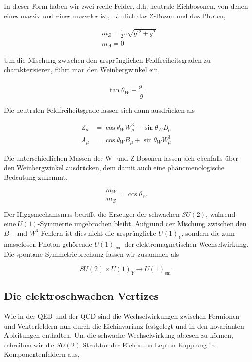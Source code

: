 \documentclass[10pt, letterpaper]{article}
\begin{document}
In dieser Form haben wir zwei reelle Felder, d.h. neutrale Eichbosonen, von denen eines massiv und eines masselos ist, nämlich das Z-Boson und das Photon,

$$
\begin{aligned}
& m_{Z}=\frac{1}{2} v \sqrt{g^{\prime 2}+g^{2}} \\
& m_{A}=0
\end{aligned}
$$

Um die Mischung zwischen den ursprünglichen Feldfreiheitsgraden zu charakterisieren, führt man den Weinbergwinkel ein,

$$
\tan \theta_{W} \equiv \frac{g^{\prime}}{g}
$$

Die neutralen Feldfreiheitsgrade lassen sich dann ausdrücken als

$$
\begin{aligned}
Z_{\mu} & =\cos \theta_{W} W_{\mu}^{3}-\sin \theta_{W} B_{\mu} \\
A_{\mu} & =\cos \theta_{W} B_{\mu}+\sin \theta_{W} W_{\mu}^{3}
\end{aligned}
$$

Die unterschiedlichen Massen der W- und Z-Bosonen lassen sich ebenfalls über den Weinbergwinkel ausdrücken, dem damit auch eine phänomenologische Bedeutung zukommt,

$$
\frac{m_{W}}{m_{Z}}=\cos \theta_{W}
$$

Der Higgsmechanismus betrifft die Erzeuger der schwachen $S U(2)$, während eine $U(1)$-Symmetrie ungebrochen bleibt. Aufgrund der Mischung zwischen den $B$ - und $W^{3}$-Feldern ist dies nicht die ursprüngliche $U(1)_{Y}$, sondern die zum masselosen Photon gehörende $U(1)_{\text {em }}$ der elektromagnetischen Wechselwirkung. Die spontane Symmetriebrechung fassen wir zusammen als

$$
S U(2) \times U(1)_{Y} \rightarrow U(1)_{\mathrm{em}} .
$$

\subsection*{Die elektroschwachen Vertizes}
Wie in der QED und der QCD sind die Wechselwirkungen zwischen Fermionen und Vektorfeldern nun durch die Eichinvarianz festgelegt und in den kovarianten Ableitungen enthalten. Um die schwache Wechselwirkung ablesen zu können, schreiben wir die $S U(2)$-Struktur der Eichboson-Lepton-Kopplung in Komponentenfeldern aus,
\end{document}
